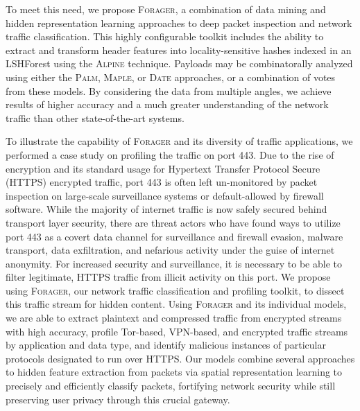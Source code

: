 To meet this need, we propose \textsc{Forager}, a combination of data mining and hidden representation learning approaches to deep packet inspection and network traffic classification. This highly configurable toolkit includes the ability to extract and transform header features into locality-sensitive hashes indexed in an LSHForest using the \textsc{Alpine} technique. Payloads may be combinatorally analyzed using either the \textsc{Palm}, \textsc{Maple}, or \textsc{Date} approaches, or a combination of votes from these models. By considering the data from multiple angles, we achieve results of higher accuracy and a much greater understanding of the network traffic than other state-of-the-art systems.

To illustrate the capability of \textsc{Forager} and its diversity of traffic applications, we performed a case study on profiling the traffic on port 443. Due to the rise of encryption and its standard usage for Hypertext Transfer Protocol Secure (HTTPS) encrypted traffic, port 443 is often left un-monitored by packet inspection on large-scale surveillance systems or default-allowed by firewall software. While the majority of internet traffic is now safely secured behind transport layer security, there are threat actors who have found ways to utilize port 443 as a covert data channel for surveillance and firewall evasion, malware transport, data exfiltration, and nefarious activity under the guise of internet anonymity. For increased security and surveillance, it is necessary to be able to filter legitimate, HTTPS traffic from illicit activity on this port. We propose using \textsc{Forager}, our network traffic classification and profiling toolkit, to dissect this traffic stream for hidden content. Using \textsc{Forager} and its individual models, we are able to extract plaintext and compressed traffic from encrypted streams with high accuracy, profile Tor-based, VPN-based, and encrypted traffic streams by application and data type, and identify malicious instances of particular protocols designated to run over HTTPS. Our models combine several approaches to hidden feature extraction from packets via spatial representation learning to precisely and efficiently classify packets, fortifying network security while still preserving user privacy through this crucial gateway.
